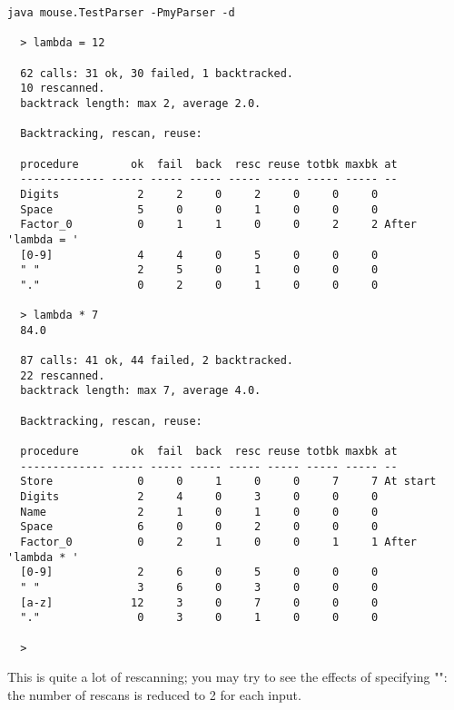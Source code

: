 \small
\begin{Verbatim}[samepage=true,xleftmargin=15mm,xrightmargin=15mm,baselinestretch=0.75]
  java mouse.TestParser -PmyParser -d

  > lambda = 12
 
  62 calls: 31 ok, 30 failed, 1 backtracked.
  10 rescanned.
  backtrack length: max 2, average 2.0.

  Backtracking, rescan, reuse:

  procedure        ok  fail  back  resc reuse totbk maxbk at             
  ------------- ----- ----- ----- ----- ----- ----- ----- --             
  Digits            2     2     0     2     0     0     0
  Space             5     0     0     1     0     0     0
  Factor_0          0     1     1     0     0     2     2 After 'lambda = '
  [0-9]             4     4     0     5     0     0     0
  " "               2     5     0     1     0     0     0
  "."               0     2     0     1     0     0     0
  
  > lambda * 7
  84.0
    
  87 calls: 41 ok, 44 failed, 2 backtracked.
  22 rescanned.
  backtrack length: max 7, average 4.0.

  Backtracking, rescan, reuse:

  procedure        ok  fail  back  resc reuse totbk maxbk at             
  ------------- ----- ----- ----- ----- ----- ----- ----- --             
  Store             0     0     1     0     0     7     7 At start       
  Digits            2     4     0     3     0     0     0
  Name              2     1     0     1     0     0     0
  Space             6     0     0     2     0     0     0
  Factor_0          0     2     1     0     0     1     1 After 'lambda * '
  [0-9]             2     6     0     5     0     0     0
  " "               3     6     0     3     0     0     0  
  [a-z]            12     3     0     7     0     0     0
  "."               0     3     0     1     0     0     0
  
  >
\end{Verbatim}
\normalsize

This is quite a lot of rescanning; you may try to see the effects of specifying
"":
the number of rescans is reduced to 2 for each input.
